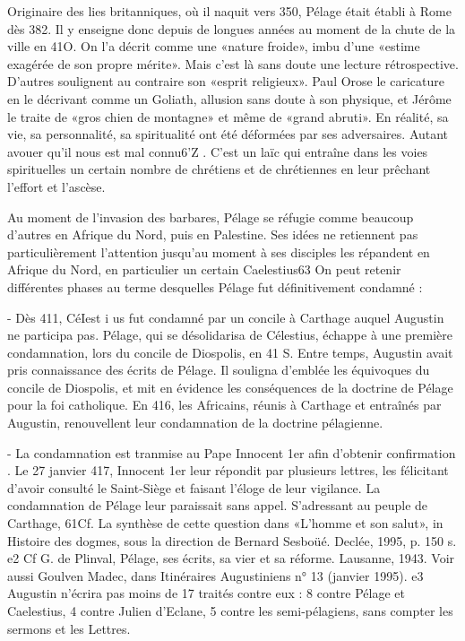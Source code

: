 Originaire des lies britanniques, où il naquit vers 350, Pélage était établi à Rome dès 382. Il y enseigne donc depuis de longues années au moment de la chute de la ville en 41O. On l'a décrit comme une «nature froide», imbu d'une «estime exagérée de son propre mérite». Mais c'est là sans doute une lecture rétrospective. D'autres soulignent au contraire son «esprit religieux». Paul Orose le caricature en le décrivant comme un Goliath, allusion sans doute à son physique, et Jérôme le traite de
«gros chien de montagne» et même de «grand abruti». En réalité, sa vie, sa personnalité, sa spiritualité ont été déformées par ses adversaires. Autant avouer qu'il nous est mal connu6'Z . C'est un laïc qui entraîne dans les voies spirituelles un certain nombre de chrétiens et de chrétiennes en leur prêchant l'effort et l'ascèse.

Au moment de l'invasion des barbares, Pélage se réfugie comme beaucoup d'autres en Afrique du Nord, puis en Palestine. Ses idées ne retiennent pas particulièrement l'attention jusqu'au moment à ses disciples les répandent en Afrique du Nord, en particulier un certain Caelestius63   On peut retenir différentes phases au terme desquelles Pélage fut définitivement condamné :

-	Dès 411, CéIest i us fut condamné par un concile à Carthage auquel Augustin ne participa pas. Pélage, qui se désolidarisa de Célestius, échappe à une première condamnation, lors du concile de Diospolis, en 41 S. Entre temps, Augustin avait pris connaissance des écrits de Pélage. Il souligna d'emblée les équivoques du concile de Diospolis, et mit en évidence les conséquences de la doctrine de Pélage pour la foi catholique. En 416, les Africains, réunis à Carthage et entraînés par Augustin, renouvellent leur condamnation de la doctrine pélagienne.

-	La condamnation est tranmise au Pape Innocent 1er afin d'obtenir confirmation . Le 27 janvier 417, Innocent 1er leur répondit par plusieurs lettres, les félicitant d'avoir consulté le Saint-Siège et faisant l'éloge de leur vigilance. La condamnation de Pélage leur paraissait sans appel. S'adressant au peuple de Carthage,
61Cf. La synthèse de cette question dans «L'homme et son salut», in Histoire des dogmes, sous la direction de Bernard Sesboüé. Declée, 1995, p. 150 s.
e2 Cf G. de Plinval, Pélage, ses écrits, sa vier et sa réforme. Lausanne, 1943. Voir aussi Goulven Madec, dans Itinéraires Augustiniens n° 13 (janvier 1995).
e3 Augustin n'écrira pas moins de 17 traités contre eux : 8 contre Pélage et Caelestius, 4 contre Julien d'Eclane, 5 contre les semi-pélagiens, sans compter les sermons et les Lettres.
 
